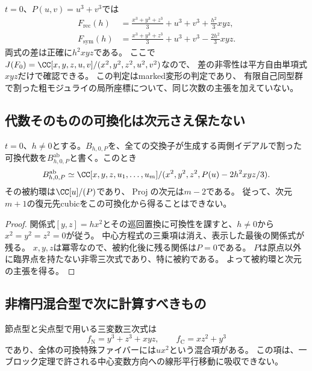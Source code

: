 \begin{example}[Fermatブロック]
\label{em:ex:fermat}
$t=0$、$P(u,v)=u^3+v^3$では
\begin{align*}
 F_{\mathrm{rec}}(h)&=\frac{x^3+y^3+z^3}{3}+u^3+v^3
                       +\frac{h^2}{3}xyz,\\
 F_{\mathrm{sym}}(h)&=\frac{x^3+y^3+z^3}{3}+u^3+v^3
                       -\frac{2h^2}{3}xyz.
\end{align*}
両式の差は正確に$h^2xyz$である。
ここで$J(F_0)=\CC[x,y,z,u,v]/(x^2,y^2,z^2,u^2,v^2)$なので、
差の非零性は平方自由単項式$xyz$だけで確認できる。
この判定はmarked変形の判定であり、
有限自己同型群で割った粗モジュライの局所座標について、同じ次数の主張を加えていない。
\end{example}

\subsection{代数そのものの可換化は次元さえ保たない}

\begin{proposition}[文字通りの可換化の失敗]
\label{em:prop:abelianization}
$t=0$、$h\ne0$とする。$B_{h,0,P}$を、全ての交換子が生成する両側イデアルで割った
可換代数を$B_{h,0,P}^{\mathrm{ab}}$と書く。このとき
\[
 B_{h,0,P}^{\mathrm{ab}}
 \simeq
 \CC[x,y,z,u_1,\ldots,u_m]
 /(x^2,y^2,z^2,P(u)-2h^2xyz/3).
\]
その被約環は$\CC[u]/(P)$であり、$\operatorname{Proj}$の次元は$m-2$である。
従って、次元$m+1$の復元先cubicをこの可換化から得ることはできない。
\end{proposition}
\begin{proof}
関係式$[y,z]=hx^2$とその巡回置換に可換性を課すと、$h\ne0$から
$x^2=y^2=z^2=0$が従う。
中心方程式の三乗項は消え、表示した最後の関係式が残る。
$x,y,z$は冪零なので、被約化後に残る関係は$P=0$である。
$P$は原点以外に臨界点を持たない非零三次式であり、特に被約である。
よって被約環と次元の主張を得る。
\end{proof}

\subsection{非楕円混合型で次に計算すべきもの}

節点型と尖点型で用いる三変数三次式は
\[
 f_{\mathrm N}=y^3+z^3+xyz,\qquad
 f_{\mathrm C}=xz^2+y^3
\]
であり、全体の可換特殊ファイバーには$ux^2$という混合項がある。
この項は、一ブロック定理で許される中心変数方向への線形平行移動に吸収できない。

